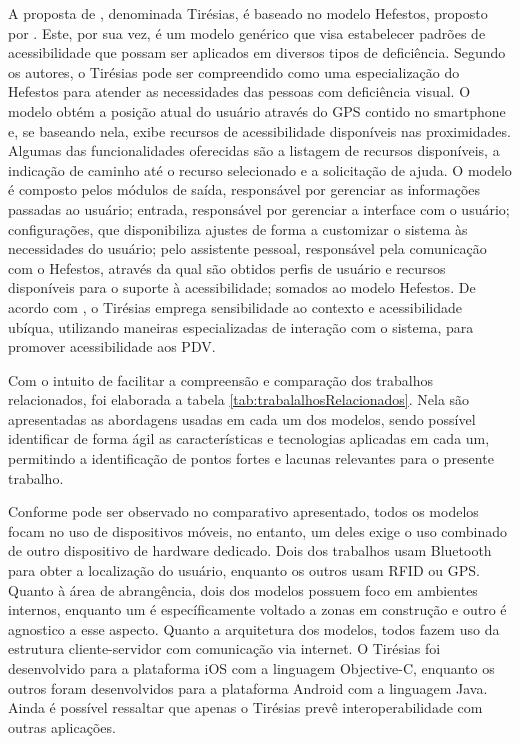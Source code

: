 \documentclass[twoside,english,brazilian]{UNISINOSartigo}
\begin{document}
A proposta de , denominada Tirésias, é baseado no modelo Hefestos, proposto por . Este, por sua vez, é um modelo genérico que visa estabelecer padrões de acessibilidade que possam ser aplicados em diversos tipos de deficiência. Segundo os autores, o Tirésias pode ser compreendido como uma especialização do Hefestos para atender as necessidades das pessoas com deficiência visual. O modelo obtém a posição atual do usuário através do GPS contido no smartphone e, se baseando nela, exibe recursos de acessibilidade disponíveis nas proximidades. Algumas das funcionalidades oferecidas são a listagem de recursos disponíveis, a indicação de caminho até o recurso selecionado e a solicitação de ajuda. O modelo é composto pelos módulos de saída, responsável por gerenciar as informações passadas ao usuário; entrada, responsável por gerenciar a interface com o usuário; configurações, que disponibiliza ajustes de forma a customizar o sistema às necessidades do usuário; pelo assistente pessoal, responsável pela comunicação com o Hefestos, através da qual são obtidos perfis de usuário e recursos disponíveis para o suporte à acessibilidade; somados ao modelo Hefestos. De acordo com , o Tirésias emprega sensibilidade ao contexto e acessibilidade ubíqua, utilizando maneiras especializadas de interação com o sistema, para promover acessibilidade aos PDV.

Com o intuito de facilitar a compreensão e comparação dos trabalhos relacionados, foi elaborada a tabela \ref{tab:trabalalhosRelacionados}. Nela são apresentadas as abordagens usadas em cada um dos modelos, sendo possível identificar de forma ágil as características e tecnologias aplicadas em cada um, permitindo a identificação de pontos fortes e lacunas relevantes para o presente trabalho.

Conforme pode ser observado no comparativo apresentado, todos os modelos focam no uso de dispositivos móveis, no entanto, um deles exige o uso combinado de outro dispositivo de hardware dedicado. Dois dos trabalhos usam Bluetooth para obter a localização do usuário, enquanto os outros usam RFID ou GPS. Quanto à área de abrangência, dois dos modelos possuem foco em ambientes internos, enquanto um é específicamente voltado a zonas em construção e outro é agnostico a esse aspecto.
Quanto a arquitetura dos modelos, todos fazem uso da estrutura cliente-servidor com comunicação via internet. O Tirésias foi desenvolvido para a plataforma iOS com a linguagem Objective-C, enquanto os outros foram desenvolvidos para a plataforma Android com a linguagem Java. Ainda é possível ressaltar que apenas o Tirésias prevê interoperabilidade com outras aplicações.
\end{document}
